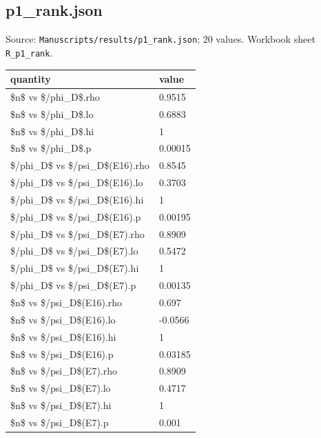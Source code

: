 \subsection*{p1\_rank.json}
\noindent\small Source: \nolinkurl{Manuscripts/results/p1_rank.json}; 20 values. Workbook sheet \texttt{R\_p1\_rank}.\par
{\scriptsize\begin{longtable}{p{}p{}}\toprule\textbf{quantity} & \textbf{value}\\\midrule\endhead
{}\$n\$ vs \$/phi\_D\$.rho & 0.9515\\
{}\$n\$ vs \$/phi\_D\$.lo & 0.6883\\
{}\$n\$ vs \$/phi\_D\$.hi & 1\\
{}\$n\$ vs \$/phi\_D\$.p & 0.00015\\
{}\$/phi\_D\$ vs \$/psi\_D\$(E16).rho & 0.8545\\
{}\$/phi\_D\$ vs \$/psi\_D\$(E16).lo & 0.3703\\
{}\$/phi\_D\$ vs \$/psi\_D\$(E16).hi & 1\\
{}\$/phi\_D\$ vs \$/psi\_D\$(E16).p & 0.00195\\
{}\$/phi\_D\$ vs \$/psi\_D\$(E7).rho & 0.8909\\
{}\$/phi\_D\$ vs \$/psi\_D\$(E7).lo & 0.5472\\
{}\$/phi\_D\$ vs \$/psi\_D\$(E7).hi & 1\\
{}\$/phi\_D\$ vs \$/psi\_D\$(E7).p & 0.00135\\
{}\$n\$ vs \$/psi\_D\$(E16).rho & 0.697\\
{}\$n\$ vs \$/psi\_D\$(E16).lo & -0.0566\\
{}\$n\$ vs \$/psi\_D\$(E16).hi & 1\\
{}\$n\$ vs \$/psi\_D\$(E16).p & 0.03185\\
{}\$n\$ vs \$/psi\_D\$(E7).rho & 0.8909\\
{}\$n\$ vs \$/psi\_D\$(E7).lo & 0.4717\\
{}\$n\$ vs \$/psi\_D\$(E7).hi & 1\\
{}\$n\$ vs \$/psi\_D\$(E7).p & 0.001\\
\bottomrule\end{longtable}}

